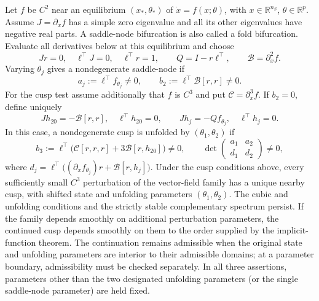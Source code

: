\label{p:cusprobust}
Let $f$ be $C^2$ near an equilibrium $(x_*,\theta_*)$ of
$\dot x=f(x;\theta)$, with $x\in\mathbb R^{n_S}$, $\theta\in\mathbb R^p$.
Assume $J=\partial_xf$ has a simple zero eigenvalue and all its other
eigenvalues have negative real parts.
A saddle-node bifurcation is also called a fold bifurcation.
Evaluate all derivatives below
at this equilibrium and choose
\[
 Jr=0,\quad \ell^\top J=0,\quad \ell^\top r=1,\qquad
 Q=I-r\ell^\top,\qquad \mathcal B=\partial_x^2f.
\]
\BEN \im
Varying $\theta_j$ gives a nondegenerate saddle-node if
\[
 a_j:=\ell^\top f_{\theta_j}\ne0,\qquad
 b_2:=\ell^\top\mathcal B[r,r]\ne0.
\]
\im
For the cusp test assume additionally that $f$ is $C^3$ and put
$\mathcal C=\partial_x^3f$.
If $b_2=0$, define uniquely
\[
 Jh_{20}=-\mathcal B[r,r],\quad\ell^\top h_{20}=0,
 \qquad Jh_j=-Qf_{\theta_j},\quad\ell^\top h_j=0.
\]
In this case, a nondegenerate cusp is unfolded by $(\theta_1,\theta_2)$ if
\[
 b_3:=\ell^\top\bigl(\mathcal C[r,r,r]
                  +3\mathcal B[r,h_{20}]\bigr)\ne0,
 \qquad
 \det\begin{pmatrix}a_1&a_2\\d_1&d_2\end{pmatrix}\ne0,
\]
where $d_j=\ell^\top\bigl((\partial_xf_{\theta_j})r+
\mathcal B[r,h_j]\bigr)$.
\im
Under the cusp conditions above, every sufficiently small $C^3$
perturbation of the vector-field family has a unique nearby cusp,
with shifted state and unfolding parameters $(\theta_1,\theta_2)$.
The cubic and unfolding conditions and the strictly stable complementary
spectrum persist. If the family depends smoothly on additional
perturbation parameters, the continued cusp depends smoothly on them
to the order supplied by the implicit-function theorem.
The continuation remains admissible when the original state and
unfolding parameters are interior to their admissible domains;
at a parameter boundary, admissibility must be checked separately.
\EEN
In all three assertions, parameters other than the two designated
unfolding parameters (or the single saddle-node parameter) are held fixed.
\eeP

